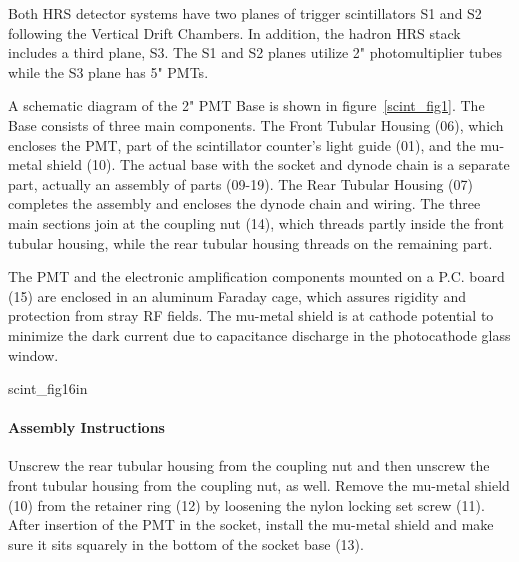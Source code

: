 

Both HRS detector systems have two planes of trigger scintillators S1 and S2
following the Vertical Drift Chambers. In addition, the hadron HRS stack includes
a third plane, S3. The S1 and S2 planes utilize 2" photomultiplier tubes while the 
S3 plane has 5" PMTs.

   A schematic diagram of the 2" PMT Base is shown in figure~\ref{scint_fig1}. 
 The Base consists of three main components. 
The 
Front Tubular Housing (06), which encloses the PMT, part of the scintillator 
counter's light guide (01), and the mu-metal shield (10). The actual base with 
the socket and dynode chain is a separate part, actually an assembly of parts 
(09-19). The Rear Tubular Housing (07) completes the assembly and encloses the 
dynode chain and wiring. The three main sections join at the coupling nut (14), 
which threads partly inside the front tubular housing, while the rear tubular 
housing threads on the remaining part.

The PMT and the electronic amplification components mounted on a P.C. board 
(15) are enclosed in an aluminum Faraday cage, which assures rigidity and 
protection from stray RF fields. The mu-metal shield is at cathode potential to 
minimize the dark current due to capacitance discharge in the photocathode 
glass window.

{scint_fig1}{6in}

\paragraph{Assembly Instructions}

   Unscrew the rear tubular housing from the coupling nut and then unscrew the
front tubular housing from the coupling nut, as well.  Remove the mu-metal
shield (10) from the retainer ring (12) by loosening the nylon locking set screw
(11). After insertion of the PMT in the socket, install the mu-metal shield and
make sure it sits squarely in the bottom of the socket base (13). 

